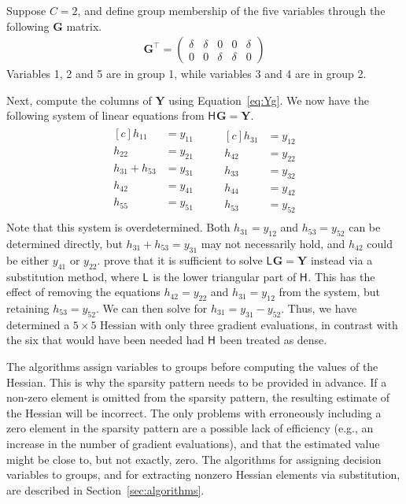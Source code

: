 \documentclass[jss]{jss}\usepackage[]{graphicx}\usepackage[]{color}
\newcommand{\hess}[2]{\mathsf{H}_{#1}#2}
\newcommand{\hessLT}[2]{\mathsf{L}_{#1}#2}
\newcommand{\Mat}[1]{\mathbf{#1}}
\begin{document}
Suppose $C=2$, and define group membership of the five variables through the following $\Mat{G}$ matrix.
\begin{align}
  \label{eq:7}
 \Mat{G}^\top= \begin{pmatrix}
 \delta&\delta&0&0&\delta\\
 0&0&\delta&\delta&0
 \end{pmatrix}
\end{align}
Variables 1, 2 and 5 are in group 1, while variables 3 and 4 are in
group 2.

Next, compute the columns of $\Mat{Y}$ using Equation~\ref{eq:Yg}.  We now
have the following system of linear equations from $\hess{}{}\Mat{G}=\Mat{Y}$.
\begin{align}
  \label{eq:11}
  \begin{aligned}[c]
  h_{11}&=y_{11}\\
  h_{22}&=y_{21}\\
  h_{31}+h_{53}&=y_{31}\\
  h_{42}&=y_{41}\\
  h_{55}&=y_{51}\\
  \end{aligned}
  \qquad
  \begin{aligned}[c]
  h_{31}&=y_{12}\\
  h_{42}&=y_{22}\\
  h_{33}&=y_{32}\\
  h_{44}&=y_{42}\\
  h_{53}&=y_{52}
  \end{aligned}
\end{align}
Note that this system is overdetermined.  Both $h_{31}=y_{12}$ and $h_{53}=y_{52}$
can be determined directly, but $h_{31}+h_{53}=y_{31}$ may not
necessarily hold, and $h_{42}$
could be either $y_{41}$ or $y_{22}$.   prove
that it is sufficient to solve $\hessLT{}{}\Mat{G}=\Mat{Y}$ instead
via a substitution method, where $\hessLT{}{}$ is the lower
triangular part of $\hess{}{}$.  This has the effect of removing the equations
$h_{42}=y_{22}$ and $h_{31}=y_{12}$ from the system, but retaining
$h_{53}=y_{52}$.  We can then solve for
$h_{31}=y_{31}-y_{52}$. Thus, we have determined a
$5\times 5$ Hessian with only three gradient evaluations, in
contrast with the six that would have been needed had $\hess{}{}$ been treated
as dense.

The  algorithms assign variables to groups
before computing the values of the Hessian.  This is why the sparsity
pattern needs to be provided in advance.  If a non-zero element is
omitted from the sparsity pattern, the resulting estimate of the
Hessian will be incorrect.  The only problems with erroneously including a zero
element in the sparsity pattern are a possible lack of efficiency
(e.g., an increase in the number of gradient evaluations), and that
the estimated value might be close to, but not exactly, zero. The
algorithms for assigning decision variables to groups, and for
extracting nonzero Hessian elements via substitution, are described in
Section~\ref{sec:algorithms}.
\end{document}
